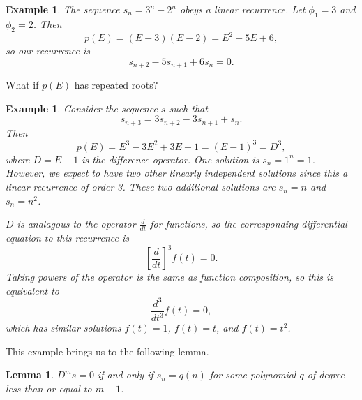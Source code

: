 \documentclass[11pt]{article}
\newtheorem{lemma}[theorem]{Lemma}
\newtheorem{example}[theorem]{Example}
\begin{document}
\begin{example}
The sequence $s_n = 3^n - 2^n$ obeys a linear recurrence.  Let $\phi_1 = 3$ and $\phi_2 = 2$.  Then
$$p(E) = (E-3)(E-2) = E^2 - 5E + 6,$$
so our recurrence is
$$s_{n+2} - 5s_{n+1} + 6s_n = 0.$$
\end{example}

What if $p(E)$ has repeated roots?

\begin{example}
Consider the sequence $s$ such that
$$s_{n+3} = 3s_{n+2} - 3s_{n+1} + s_n.$$
Then
$$p(E) = E^3-3E^2+3E-1 = (E-1)^3 = D^3,$$ where $D = E-1$ is the difference operator.
One solution is $s_n = 1^n = 1$.  However, we expect to have two other linearly independent solutions since this a linear recurrence of order 3.  These two additional solutions are $s_n = n$ and $s_n = n^2$.

$D$ is analagous to the operator $\frac{d}{dt}$ for functions, so the corresponding differential equation to this recurrence is
$$\left[\frac{d}{dt}\right]^3 f(t) = 0.$$
Taking powers of the operator is the same as function composition, so this is equivalent to
$$\frac{d^3}{dt^3}f(t) = 0,$$
which has similar solutions $f(t) = 1$, $f(t) = t$, and $f(t) = t^2$.
\end{example}

This example brings us to the following lemma.

\begin{lemma}
$D^ms = 0$ if and only if $s_n = q(n)$ for some polynomial $q$ of degree less than or equal to $m-1$.
\end{lemma}
\end{document}
